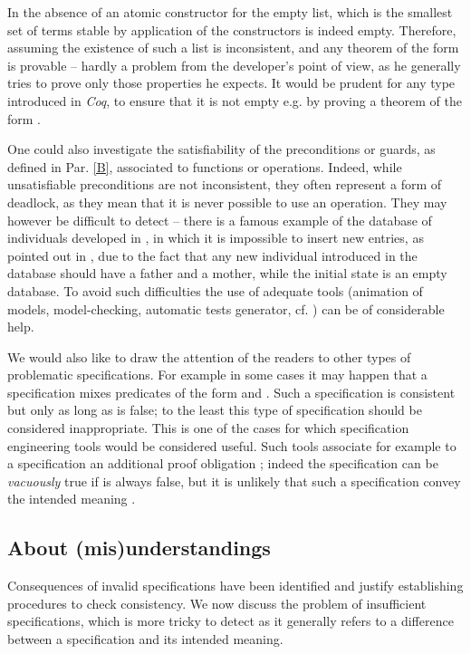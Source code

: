\documentclass[conference]{IEEEtran}
\begin{document}
In the absence of an atomic constructor for the empty list, {\small} which is the
smallest set of terms stable by application of the constructors is indeed empty. Therefore,
assuming the existence of such a list is inconsistent, and any theorem of the form
{\small} is provable -- hardly a problem from the developer's
point of view, as he generally tries to prove only those properties he expects. It would be
prudent for any type {\small} introduced in \emph{Coq}, to ensure that it is not empty e.g.
by proving a theorem of the form {\small}.

One could also investigate the satisfiability of the preconditions or guards, as defined in
Par. \ref{B}, associated to functions or operations. Indeed, while unsatisfiable preconditions
are not inconsistent, they often represent a form of deadlock, as they mean that it is never
possible to use an operation. They may however be difficult to detect -- there is a famous
example of the database of individuals developed in \cite{abr:1}, in which it is impossible to
insert new entries, as pointed out in \cite{mus:1}, due to the fact that any new individual
introduced in the database should have a father and a mother, while the initial state is an
empty database. To avoid such difficulties the use of adequate tools (animation of models,
model-checking, automatic tests generator, cf.
\cite{CarlierD2008,B07-JaffuelL,ClarkeGL96,PlaggeL07,YuML99}) can be of considerable help.

We would also like to draw the attention of the readers to other types of problematic 
specifications. For example in some cases it may happen that a specification mixes predicates
of the form {\small} and {\small}. Such a
specification is consistent but only as long as {\small} is false; to the least this type
of specification should be considered inappropriate. This is one of the cases for which
specification engineering tools would be considered useful. Such tools associate for example
to a specification {\small} an additional proof obligation
{\small}; indeed the specification can be \emph{vacuously} true if {\small}
is always false, but it is unlikely that such a specification convey the intended meaning
\cite{DBLP:conf/lpar/SamerV07}.

\subsection{About (mis)understandings}\label{misunderstandings}

Consequences of invalid specifications have been identified and justify establishing
procedures to check consistency. We now discuss the problem of insufficient specifications,
which is more tricky to detect as it generally refers to a difference between a specification
and its intended meaning.
\end{document}
